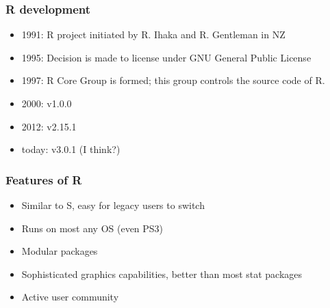 \documentclass[11pt,ignorenonframetext,]{beamer}
\begin{document}
\begin{frame}\frametitle{R development}

\begin{itemize}[<+->]
\itemsep1pt\parskip0pt
\item
  1991: R project initiated by R. Ihaka and R. Gentleman in NZ
\item
  1995: Decision is made to license under GNU General Public License
\item
  1997: R Core Group is formed; this group controls the source code of
  R.
\item
  2000: v1.0.0
\item
  2012: v2.15.1
\item
  today: v3.0.1 (I think?)
\end{itemize}

\end{frame}

\begin{frame}\frametitle{Features of R}

\begin{itemize}[<+->]
\itemsep1pt\parskip0pt
\item
  Similar to S, easy for legacy users to switch
\item
  Runs on most any OS (even PS3)
\item
  Modular packages
\item
  Sophisticated graphics capabilities, better than most stat packages
\item
  Active user community
\end{itemize}

\end{frame}
\end{document}
